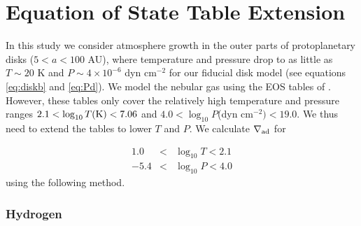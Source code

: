 \chapter{Equation of State Table Extension}\label{EOStables}

In this study we consider atmosphere growth in the outer parts of protoplanetary disks ($5<a<100$ AU), where temperature and pressure drop to as little as $T \sim 20$ K and $P \sim4\times10^{-6}$ dyn cm$^{-2}$ for our fiducial disk model (see equations \ref{eq:diskb} and \ref{eq:Pd}). We model the nebular gas using the EOS tables of \citet{saumon95}. However, these tables only cover the relatively high temperature and pressure ranges $2.1 < \log_{10} T(\rm{K})<7.06$ and $4.0<\log_{10}P$(dyn cm$^{-2})<19.0$. We thus need to extend the tables to lower $T$ and $P$. We calculate $\nabla_{\rm ad}$ for

\begin{eqnarray}
1.0 & < & \log_{10} T <2.1 \\ 
-5.4& < & \log_{10} P<4.0 
\end{eqnarray} 
using the following method.





\subsection{Hydrogen}

\label{hydrogen}


